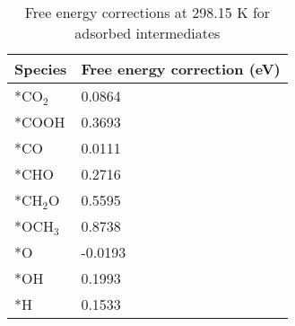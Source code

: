 \begin{table}[h]
  \centering
  {\fontsize{10}{12}\selectfont
  \begin{tabular}{ll}
    \hline
    \textbf{Species}  & \textbf{Free energy correction (eV)} \\
    \hline
    *CO$_2$  & 0.0864                      \\
    *COOH    & 0.3693                      \\
    *CO      & 0.0111                      \\
    *CHO     & 0.2716                      \\
    *CH$_2$O & 0.5595                      \\
    *OCH$_3$ & 0.8738                      \\
    *O       & -0.0193                     \\
    *OH      & 0.1993                      \\
    *H       & 0.1533                      \\
    \hline
  \end{tabular}
  }
  \caption{Free energy corrections at 298.15 K for adsorbed intermediates}
  \label{si_table3}
\end{table}


